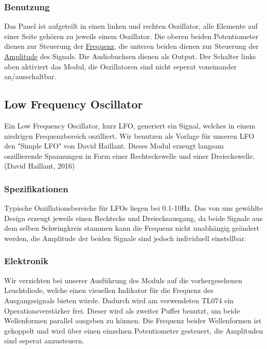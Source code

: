 \subsubsection{Benutzung}
\label{sec:org55ec232}
Das Panel ist aufgeteilt in einen linken und rechten Oszillator, alle Elemente auf einer Seite gehören zu jeweils einem Oszillator. Die oberen beiden Potentiometer dienen zur Steuerung der \href{file:///home/felixp/Documents/diplomarbeit/dokumentation/content/theoretische\_grundlagen.org}{Frequenz}, die unteren beiden dienen zur Steuerung der \href{file:///home/felixp/Documents/diplomarbeit/dokumentation/content/theoretische\_grundlagen.org}{Amplitude} des Signals. Die Audiobuchsen dienen als Output. Der Schalter links oben aktiviert das Modul, die Oszillatoren sind nicht seperat voneinander an/ausschaltbar.

\subsection{Low Frequency Oscillator}
\label{sec:org6dbf6e1}
Ein Low Frequency Oscillator, kurz LFO, generiert ein Signal, welches in einem niedrigen Frequenzbereich oszilliert. Wir benutzen als Vorlage für unseren LFO den "Simple LFO" von David Haillant. Dieses Modul erzeugt langsam oszillierende Spannungen in Form einer Rechteckswelle und einer Dreieckswelle.
(David Haillant, 2016)
\subsubsection{Spezifikationen}
\label{sec:org12352e5}

Typische Oszillationsbereiche für LFOs liegen bei 0.1-10Hz. Das  von uns gewählte Design erzeugt jeweils einen Rechtecks und Dreiecksausgang, da beide Signale aus dem selben Schwingkreis stammen kann die Frequenz nicht unabhängig geändert werden, die Amplitude der beiden Signale sind jedoch individuell einstellbar.

\subsubsection{Elektronik}
\label{sec:org4682fca}
Wir verzichten bei unserer Ausführung des Moduls auf die vorhergesehenen Leuchtdiode, welche einen visuellen Indikator für die Frequenz des Ausgangssignals bieten würde. Dadurch wird am verwendeten TL074 ein Operationsverstärker frei. Dieser wird als zweiter Puffer benutzt, um beide Wellenformen parallel ausgeben zu können. Die Frequenz beider Wellenformen ist gekoppelt und wird über einen einzelnen Potentiometer gesteuert, die Amplituden sind seperat anzusteuern.

